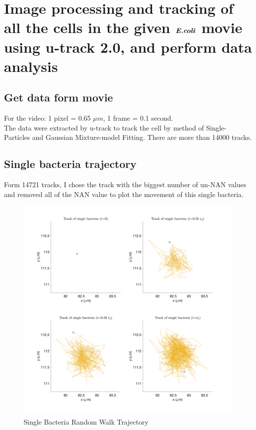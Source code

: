 \chapter{Image processing and tracking of all the cells in the given $\textbf{\textit{E.coli}}$ movie using u-track 2.0, and perform data analysis} %

\label{Part1_chapter} %

\section{Get data form movie}
 
For the video: 1 pixel = 0.65 $\mu m$, 1 frame = 0.1 second.\\
The data were extracted by u-track to track the cell by method of Single-Particles and Gaussian Mixture-model Fitting. There are more than 14000 tracks.

\newpage
\section{Single bacteria trajectory}

Form 14721 tracks, I chose the track with the biggest number of un-NAN values and removed all of the NAN value to plot the movement of this single bacteria. 


\begin{figure}[H]
\centering
\includegraphics[width=1\linewidth]{Figures/P3_fig1.png}
\caption{Single Bacteria Random Walk Trajectory}
\label{P2_fig1}
\end{figure}

